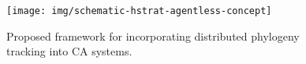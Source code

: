 \begin{figure}
\texttt{[image: img/schematic-hstrat-agentless-concept]}
\caption{Proposed framework for incorporating distributed phylogeny tracking into CA systems.}
\label{fig:hstrat-agentless-concept}
\end{figure}
